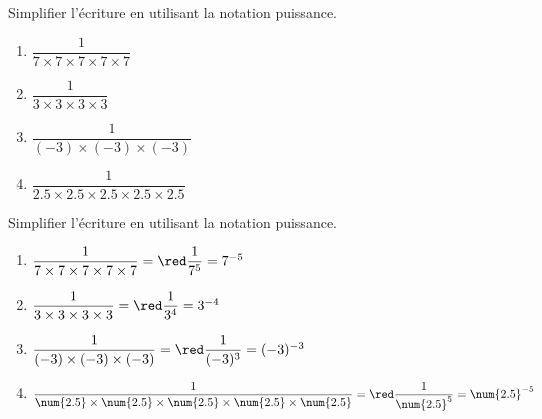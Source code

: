 \begin{exercice*}
    Simplifier l'écriture en utilisant la notation puissance.
    \begin{spacing}{2}
        \begin{multicols}{2}
            \begin{enumerate}
                \item $\dfrac{1}{7\times 7\times 7\times 7\times 7}$
                \item $\dfrac{1}{3\times 3\times 3\times 3}$
                \item $\dfrac{1}{(-3)\times (-3)\times (-3)}$
                \item $\dfrac{1}{\num{2.5}\times \num{2.5}\times \num{2.5}\times \num{2.5}\times \num{2.5}}$
            \end{enumerate}
        \end{multicols}
    \end{spacing}
\end{exercice*}
\begin{corrige}
    Simplifier l'écriture en utilisant la notation puissance.
    \begin{spacing}{2}
        \begin{enumerate}
            \item $\dfrac{1}{7\times 7\times 7\times 7\times 7}                                         ={\red \dfrac{1}{7^5}          = 7^{-5}}$
            \item $\dfrac{1}{3\times 3\times 3\times 3}                                                 ={\red \dfrac{1}{3^4}          = 3^{-4}}$
            \item $\dfrac{1}{(-3)\times (-3)\times (-3)}                                                ={\red \dfrac{1}{(-3)^3}       = (-3)^{-3}}$
            \item $\dfrac{1}{\num{2.5}\times \num{2.5}\times \num{2.5}\times \num{2.5}\times \num{2.5}} ={\red \dfrac{1}{\num{2.5}^5}  = \num{2.5}^{-5}}$
        \end{enumerate}
    \end{spacing}
\end{corrige}

